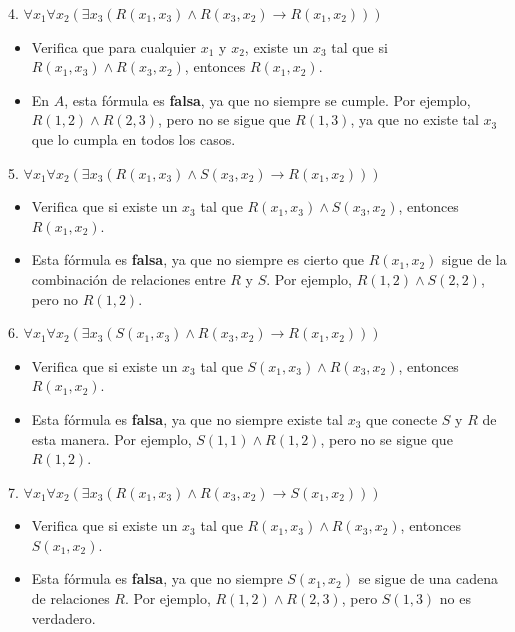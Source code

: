 \begin{solution}
4. \(\forall x_1 \forall x_2 (\exists x_3 (R(x_1, x_3) \land R(x_3, x_2) \to R(x_1, x_2)))\)

\begin{itemize}
    \item Verifica que para cualquier \( x_1 \) y \( x_2 \), existe un \( x_3 \) tal que si \( R(x_1, x_3) \land R(x_3, x_2) \), entonces \( R(x_1, x_2) \).
    \item En $A$, esta fórmula es \textbf{falsa}, ya que no siempre se cumple. Por ejemplo, \( R(1, 2) \land R(2, 3) \), pero no se sigue que \( R(1, 3) \), ya que no existe tal \( x_3 \) que lo cumpla en todos los casos.
\end{itemize}

5. \(\forall x_1 \forall x_2 (\exists x_3 (R(x_1, x_3) \land S(x_3, x_2) \to R(x_1, x_2)))\)

\begin{itemize}
    \item Verifica que si existe un \( x_3 \) tal que \( R(x_1, x_3) \land S(x_3, x_2) \), entonces \( R(x_1, x_2) \).
    \item Esta fórmula es \textbf{falsa}, ya que no siempre es cierto que \( R(x_1, x_2) \) sigue de la combinación de relaciones entre \( R \) y \( S \). Por ejemplo, \( R(1, 2) \land S(2, 2) \), pero no \( R(1, 2) \).
\end{itemize}

6. \(\forall x_1 \forall x_2 (\exists x_3 (S(x_1, x_3) \land R(x_3, x_2) \to R(x_1, x_2)))\)

\begin{itemize}
    \item Verifica que si existe un \( x_3 \) tal que \( S(x_1, x_3) \land R(x_3, x_2) \), entonces \( R(x_1, x_2) \).
    \item Esta fórmula es \textbf{falsa}, ya que no siempre existe tal \( x_3 \) que conecte \( S \) y \( R \) de esta manera. Por ejemplo, \( S(1, 1) \land R(1, 2) \), pero no se sigue que \( R(1, 2) \).
\end{itemize}

7. \(\forall x_1 \forall x_2 (\exists x_3 (R(x_1, x_3) \land R(x_3, x_2) \to S(x_1, x_2)))\)

\begin{itemize}
    \item Verifica que si existe un \( x_3 \) tal que \( R(x_1, x_3) \land R(x_3, x_2) \), entonces \( S(x_1, x_2) \).
    \item Esta fórmula es \textbf{falsa}, ya que no siempre \( S(x_1, x_2) \) se sigue de una cadena de relaciones \( R \). Por ejemplo, \( R(1, 2) \land R(2, 3) \), pero \( S(1, 3) \) no es verdadero.
\end{itemize}


\end{solution}
